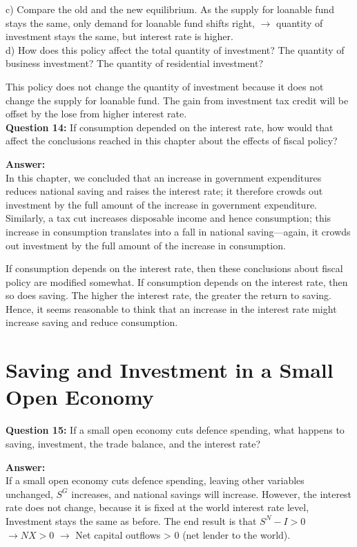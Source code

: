 \documentclass[a4paper, 11pt]{article}
\begin{document}
c) Compare the old and the new equilibrium. 
As the supply for loanable fund stays the same, only demand for loanable fund shifts right, $\rightarrow$ quantity of investment stays the same, but interest rate is higher. \\

d) How does this policy affect the total quantity of investment? The quantity of business investment? The quantity of residential investment?

This policy does not change the quantity of investment because it does not change the supply for loanable fund. The gain from investment tax credit will be offset by the lose from higher interest rate. \\

\textbf{Question 14:} If consumption depended on the interest rate, how would that affect the conclusions reached in this chapter about the effects of fiscal policy?

\textbf{Answer:}  \\

In this chapter, we concluded that an increase in government expenditures reduces
national saving and raises the interest rate; it therefore crowds out investment by the full
amount of the increase in government expenditure. Similarly, a tax cut increases
disposable income and hence consumption; this increase in consumption translates into a
fall in national saving—again, it crowds out investment by the full amount of the increase
in consumption.

If consumption depends on the interest rate, then these conclusions about fiscal policy
are modified somewhat. If consumption depends on the interest rate, then so does saving.
The higher the interest rate, the greater the return to saving. Hence, it seems reasonable
to think that an increase in the interest rate might increase saving and reduce
consumption. \\

\section{Saving and Investment in a Small Open Economy}

\textbf{Question 15:} If a small open economy cuts defence spending, what happens to saving, investment, the trade balance, and the interest rate?

\textbf{Answer:}  \\

If a small open economy cuts defence spending, leaving other variables unchanged, $S^{G}$ increases, and national savings will increase. 
However, the interest rate does not change, because it is fixed at the world interest rate level, Investment stays the same as before.
The end result is that $S^{N} - I > 0$ $\rightarrow NX > 0$ $\rightarrow$ Net capital outflows > 0 (net lender to the world). \\
\end{document}
